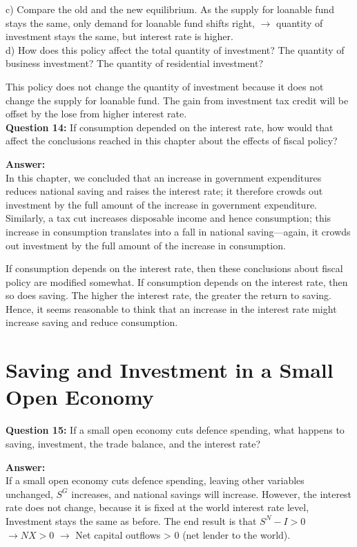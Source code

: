 \documentclass[a4paper, 11pt]{article}
\begin{document}
c) Compare the old and the new equilibrium. 
As the supply for loanable fund stays the same, only demand for loanable fund shifts right, $\rightarrow$ quantity of investment stays the same, but interest rate is higher. \\

d) How does this policy affect the total quantity of investment? The quantity of business investment? The quantity of residential investment?

This policy does not change the quantity of investment because it does not change the supply for loanable fund. The gain from investment tax credit will be offset by the lose from higher interest rate. \\

\textbf{Question 14:} If consumption depended on the interest rate, how would that affect the conclusions reached in this chapter about the effects of fiscal policy?

\textbf{Answer:}  \\

In this chapter, we concluded that an increase in government expenditures reduces
national saving and raises the interest rate; it therefore crowds out investment by the full
amount of the increase in government expenditure. Similarly, a tax cut increases
disposable income and hence consumption; this increase in consumption translates into a
fall in national saving—again, it crowds out investment by the full amount of the increase
in consumption.

If consumption depends on the interest rate, then these conclusions about fiscal policy
are modified somewhat. If consumption depends on the interest rate, then so does saving.
The higher the interest rate, the greater the return to saving. Hence, it seems reasonable
to think that an increase in the interest rate might increase saving and reduce
consumption. \\

\section{Saving and Investment in a Small Open Economy}

\textbf{Question 15:} If a small open economy cuts defence spending, what happens to saving, investment, the trade balance, and the interest rate?

\textbf{Answer:}  \\

If a small open economy cuts defence spending, leaving other variables unchanged, $S^{G}$ increases, and national savings will increase. 
However, the interest rate does not change, because it is fixed at the world interest rate level, Investment stays the same as before.
The end result is that $S^{N} - I > 0$ $\rightarrow NX > 0$ $\rightarrow$ Net capital outflows > 0 (net lender to the world). \\
\end{document}
